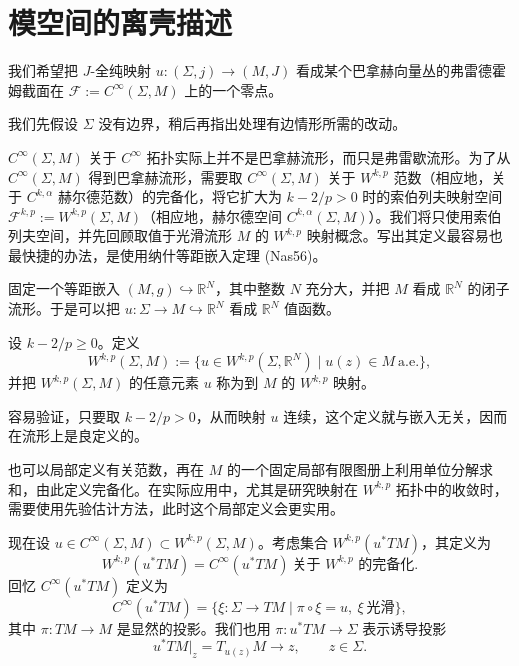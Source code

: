 \section{模空间的离壳描述}
\label{sec:off-shell-description-moduli-space}
\setcounter{equation}{2}

我们希望把 $J$-全纯映射
$u:(\Sigma,j)\to(M,J)$ 看成某个巴拿赫向量丛的弗雷德霍姆截面在
$\mathcal F:=C^\infty(\Sigma,M)$ 上的一个零点。

我们先假设 $\Sigma$ 没有边界，稍后再指出处理有边情形所需的改动。

$C^\infty(\Sigma,M)$ 关于 $C^\infty$ 拓扑实际上并不是巴拿赫流形，而只是弗雷歇流形。为了从 $C^\infty(\Sigma,M)$ 得到巴拿赫流形，需要取 $C^\infty(\Sigma,M)$ 关于 $W^{k,p}$ 范数（相应地，关于 $C^{k,\alpha}$ 赫尔德范数）的完备化，将它扩大为 $k-2/p>0$ 时的索伯列夫映射空间
$\mathcal F^{k,p}:=W^{k,p}(\Sigma,M)$（相应地，赫尔德空间
$C^{k,\alpha}(\Sigma,M)$）。我们将只使用索伯列夫空间，并先回顾取值于光滑流形 $M$ 的 $W^{k,p}$ 映射概念。写出其定义最容易也最快捷的办法，是使用纳什等距嵌入定理 (Nas56)。

固定一个等距嵌入
$(M,g)\hookrightarrow\mathbb R^N$，其中整数 $N$ 充分大，并把 $M$ 看成
$\mathbb R^N$ 的闭子流形。于是可以把
$u:\Sigma\to M\hookrightarrow\mathbb R^N$ 看成 $\mathbb R^N$ 值函数。

\begin{definition}\label{def:sobolev-maps-manifold}
设 $k-2/p\geq0$。定义
\[
 W^{k,p}(\Sigma,M):=
 \{u\in W^{k,p}(\Sigma,\mathbb R^N)\mid u(z)\in M\ \text{a.e.}\},
\]
并把 $W^{k,p}(\Sigma,M)$ 的任意元素 $u$ 称为到 $M$ 的 $W^{k,p}$ 映射。
\end{definition}

容易验证，只要取 $k-2/p>0$，从而映射 $u$ 连续，这个定义就与嵌入无关，因而在流形上是良定义的。

\begin{remark}\label{rem:local-definition-sobolev-maps}
也可以局部定义有关范数，再在 $M$ 的一个固定局部有限图册上利用单位分解求和，由此定义完备化。在实际应用中，尤其是研究映射在 $W^{k,p}$ 拓扑中的收敛时，需要使用先验估计方法，此时这个局部定义会更实用。
\end{remark}

现在设
$u\in C^\infty(\Sigma,M)\subset W^{k,p}(\Sigma,M)$。考虑集合
$W^{k,p}(u^*TM)$，其定义为
\[
 W^{k,p}(u^*TM)=C^\infty(u^*TM)\ \text{关于 $W^{k,p}$ 的完备化}.
\]
回忆 $C^\infty(u^*TM)$ 定义为
\[
 C^\infty(u^*TM)=
 \{\xi:\Sigma\to TM\mid\pi\circ\xi=u,\ \xi\ \text{光滑}\},
\]
其中 $\pi:TM\to M$ 是显然的投影。我们也用
$\pi:u^*TM\to\Sigma$ 表示诱导投影
\[
 u^*TM|_z=T_{u(z)}M\longrightarrow z,
 \qquad z\in\Sigma.
\]


